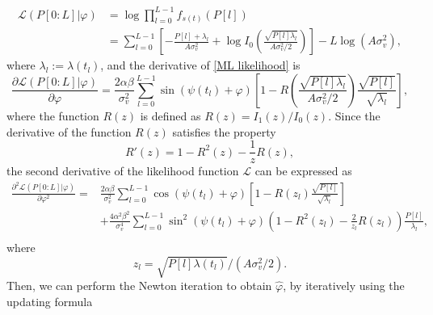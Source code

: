 \documentclass[12pt,draftclsnofoot,journal,onecolumn]{IEEEtran}
\theoremstyle{nonumberplain}
\begin{document}
    \begin{equation}
        \begin{aligned}
        \mathcal{L}(P[0:L] | \varphi) &= \log \prod_{l=0}^{L-1} f_{s (t)}(P[l])\\
        & = \sum_{l=0}^{L-1}\left[-\frac{P[l] + \lambda_l}{A\sigma_v^2} + \log I_0\left(\frac{\sqrt{P[l] \lambda_l}}{A\sigma_v^2/2}\right)\right] - L\log(A\sigma_v^2),
        \end{aligned}
        \label{ML likelihood}
    \end{equation}
    where $\lambda_l := \lambda(t_l)$, and the derivative of \eqref{ML likelihood} is 
    \begin{equation}
        \frac{\partial \mathcal{L}(P[0:L] | \varphi)}{\partial \varphi} = \frac{2\alpha\beta}{\sigma_v^2}\sum_{l=0}^{L-1}\sin(\psi(t_l)+\varphi) \left[1 - R\left( \frac{\sqrt{P[l]\lambda_l}}{A\sigma_v^2/2} \right) \frac{\sqrt{P[l]}}{\sqrt{\lambda_l}}\right],
        \label{eqn:First Derivative Likelihood}
    \end{equation}
    where the function $R(z)$ is defined as $R(z) = I_1(z)/I_0(z)$. Since the derivative of the function $R(z)$ satisfies the property \cite{silverman1972special}
    \begin{equation}
        R'(z)=1-R^2(z)-\frac{1}{z}R(z),
        \label{eqn:R function derivative property}
    \end{equation}
    the second derivative of the likelihood function $\mathcal{L}$ can be expressed as
    \begin{equation}
        \begin{aligned}
        \frac{\partial^2 \mathcal{L}(P[0:L] | \varphi)}{\partial \varphi^2}  = &  \frac{2\alpha\beta}{\sigma_v^2} \sum_{l=0}^{L-1}{\cos(\psi(t_l)+\varphi)}\left[1 - R\left(z_l\right) \frac{\sqrt{P[l]}}{\sqrt{\lambda_l}}\right] \\
        & +\frac{4\alpha^2\beta^2}{\sigma_v^4}\sum_{l=0}^{L-1}{\sin^2(\psi(t_l)+\varphi) \left(1-R^2(z_l) -\frac{2}{z_l}R(z_l)\right)\frac{P[l]}{\lambda_l} },\\
        \end{aligned}
        \label{Second Derivative Likelihood}
    \end{equation}
    where
    \begin{equation}
        z_l = \sqrt{P[l]\lambda(t_l)}/(A\sigma_v^2/2).
        \label{eqn:def z_l}
    \end{equation}
    Then, we can perform the Newton iteration to obtain $\hat{\varphi}$, by iteratively using the updating formula
\end{document}
